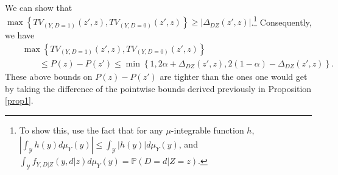 \documentclass[11pt,reqno]{amsart}
\theoremstyle{plain}
\numberwithin{equation}{section}
\begin{document}
We can show that $\max\left\{TV_{(Y,D=1)}(z',z), TV_{(Y,D=0)}(z',z) \right\} \geq \left \lvert \Delta_{DZ}(z',z)\right \rvert$.\footnote{To show this, use the fact that for any $\mu$-integrable function $h$, $\left \lvert \int_{\mathcal Y} h(y) d \mu_{Y}(y) \right \rvert \leq \int_{\mathcal Y} \left \lvert h(y) \right \rvert d \mu_{Y}(y)$, and $\int_{\mathcal Y} f_{Y,D\vert Z}\left(y, d \vert z\right) d \mu_{Y}(y) = \mathbb P(D=d\vert Z=z)$.} Consequently, we have
\begin{eqnarray}\label{eq:pzbounds}
&&\max\left\{TV_{(Y,D=1)}(z',z), TV_{(Y,D=0)}(z',z)\right\}\nonumber\\
 && \qquad \leq P(z)-P(z') \leq \min\left\{1,2\alpha+\Delta_{DZ}(z',z), 2(1-\alpha)-\Delta_{DZ}(z',z)\right\}. 
\end{eqnarray}
These above bounds on $P(z)-P(z')$ are tighter than the ones one would get by taking the difference of the pointwise bounds derived previously in Proposition \ref{prop1}. 
\end{document}
